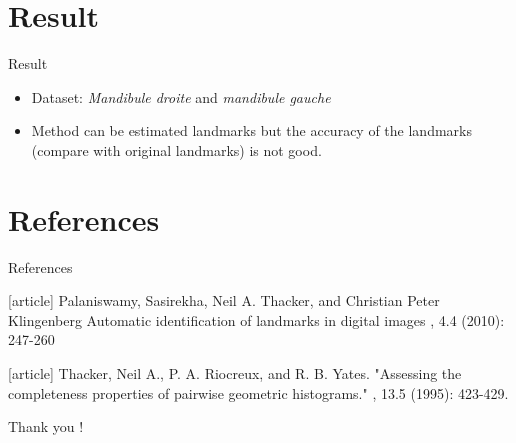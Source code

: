 \documentclass{beamer}
\begin{document}
\section{Result}
\begin{frame}{Result}
	\begin{itemize}
		\item Dataset: \textit{Mandibule droite} and \textit{mandibule gauche}
		\item Method can be estimated landmarks but the accuracy of the landmarks (compare with original landmarks) is not good.
	\end{itemize}
\end{frame}
\section{References}
\begin{frame}[allowframebreaks]{References}
	\begin{thebibliography}{10}
		[article]
		Palaniswamy, Sasirekha, Neil A. Thacker, and Christian Peter Klingenberg
		\newblock Automatic identification of landmarks in digital images
		, 4.4 (2010): 247-260
		
		[article]		
		Thacker, Neil A., P. A. Riocreux, and R. B. Yates. 
		\newblock "Assessing the completeness properties of pairwise geometric histograms." 
		, 13.5 (1995): 423-429.
	\end{thebibliography}
\end{frame}
\begin{frame}[plain]
  \Huge{\centerline{Thank you !}}
\end{frame}
\end{document}

